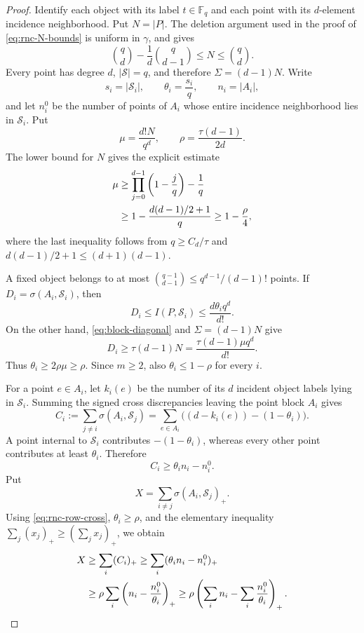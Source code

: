 \documentclass[10pt,a4paper]{amsart}
\begin{document}
\begin{proof}
Identify each object with its label $t\in\mathbb F_q$ and each point with its $d$-element incidence neighborhood.  Put $N=|P|$.  The deletion argument used in the proof of \eqref{eq:rnc-N-bounds} is uniform in $\gamma$, and gives
\[
 \binom qd-\frac1d\binom q{d-1}\le N\le\binom qd.
\]
Every point has degree $d$, $|\mathcal S|=q$, and therefore $\Sigma=(d-1)N$.  Write
\[
 s_i=|\mathcal S_i|,
 \qquad
 \theta_i=\frac{s_i}{q},
 \qquad
 n_i=|A_i|,
\]
and let $n_i^0$ be the number of points of $A_i$ whose entire incidence neighborhood lies in $\mathcal S_i$.  Put
\[
 \mu=\frac{d!N}{q^d},
 \qquad
 \rho=\frac{\tau(d-1)}{2d}.
\]
The lower bound for $N$ gives the explicit estimate
\begin{align}
 \mu
 &\ge \prod_{j=0}^{d-1}\left(1-\frac jq\right)-\frac1q\notag\\
 &\ge1-\frac{d(d-1)/2+1}{q}
 \ge1-\frac\rho4,
 \label{eq:rnc-mu}
\end{align}
where the last inequality follows from $q\ge C_d/\tau$ and $d(d-1)/2+1\le(d+1)(d-1)$.

A fixed object belongs to at most $\binom{q-1}{d-1}\le q^{d-1}/(d-1)!$ points.  If $D_i=\sigma(A_i,\mathcal S_i)$, then
\[
 D_i\le I(P,\mathcal S_i)
 \le\frac{d\theta_iq^d}{d!}.
\]
On the other hand, \eqref{eq:block-diagonal} and $\Sigma=(d-1)N$ give
\[
 D_i\ge\tau(d-1)N
 =\frac{\tau(d-1)\mu q^d}{d!}.
\]
Thus $\theta_i\ge2\rho\mu\ge\rho$.  Since $m\ge2$, also $\theta_i\le1-\rho$ for every $i$.

For a point $e\in A_i$, let $k_i(e)$ be the number of its $d$ incident object labels lying in $\mathcal S_i$.  Summing the signed cross discrepancies leaving the point block $A_i$ gives
\[
 C_i:=\sum_{j\ne i}\sigma(A_i,\mathcal S_j)
 =\sum_{e\in A_i}\bigl((d-k_i(e))-(1-\theta_i)\bigr).
\]
A point internal to $\mathcal S_i$ contributes $-(1-\theta_i)$, whereas every other point contributes at least $\theta_i$.  Therefore
\begin{equation}\label{eq:rnc-row-cross}
 C_i\ge\theta_i n_i-n_i^0.
\end{equation}
Put
\[
 X=\sum_{i\ne j}\sigma(A_i,\mathcal S_j)_+.
\]
Using \eqref{eq:rnc-row-cross}, $\theta_i\ge\rho$, and the elementary inequality $\sum_j(x_j)_+\ge(\sum_jx_j)_+$, we obtain
\begin{align}
 X
 &\ge\sum_i(C_i)_+
 \ge\sum_i(\theta_i n_i-n_i^0)_+\notag\\
 &\ge\rho\sum_i\left(n_i-\frac{n_i^0}{\theta_i}\right)_+
 \ge\rho\left(\sum_i n_i-\sum_i\frac{n_i^0}{\theta_i}\right)_+.
 \label{eq:rnc-X}
\end{align}


\end{proof}
\end{document}
